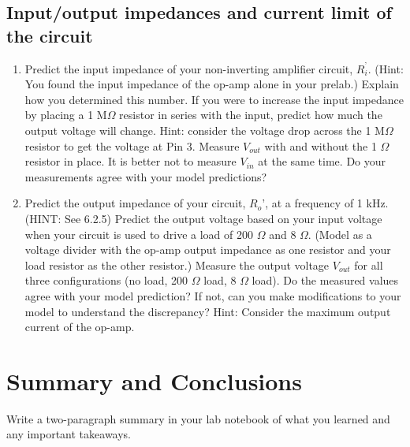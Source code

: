 \documentclass[10pt]{PhysLab1C} %
\begin{document}
\subsection{Input/output impedances and current limit of the circuit}


\begin{enumerate}
\def\labelenumi{\arabic{enumi}.}
\item
  Predict the input impedance of your non-inverting amplifier circuit,
  \(R_i^{’}\). (Hint: You found the input impedance of the op-amp alone
  in your prelab.) Explain how you determined this number. If you were
  to increase the input impedance by placing a 1 M$\Omega$ resistor in series
  with the input, predict how much the output voltage will change. Hint:
  consider the voltage drop across the 1 M$\Omega$ resistor to get the voltage
  at Pin 3. Measure \(V_{out}\) with and without the 1 $\Omega$ resistor in
  place. It is better not to measure \(V_{in}\) at the same time. Do
  your measurements agree with your model predictions?
\item
  Predict the output impedance of your circuit, \(R_o{’}\), at a
  frequency of 1 kHz. (HINT: See 6.2.5) Predict the output voltage based
  on your input voltage when your circuit is used to drive a load of 200
  $\Omega$ and 8 $\Omega$. (Model as a voltage divider with the op-amp output
  impedance as one resistor and your load resistor as the other
  resistor.) Measure the output voltage \(V_{out}\) for all three
  configurations (no load, 200 $\Omega$ load, 8 $\Omega$ load). Do the measured values
  agree with your model prediction? If not, can you make modifications
  to your model to understand the discrepancy? Hint: Consider the
  maximum output current of the op-amp.
\end{enumerate}


\section{Summary and Conclusions}

Write a two-paragraph summary in your lab notebook of what you learned
and any important takeaways.

\end{document}
